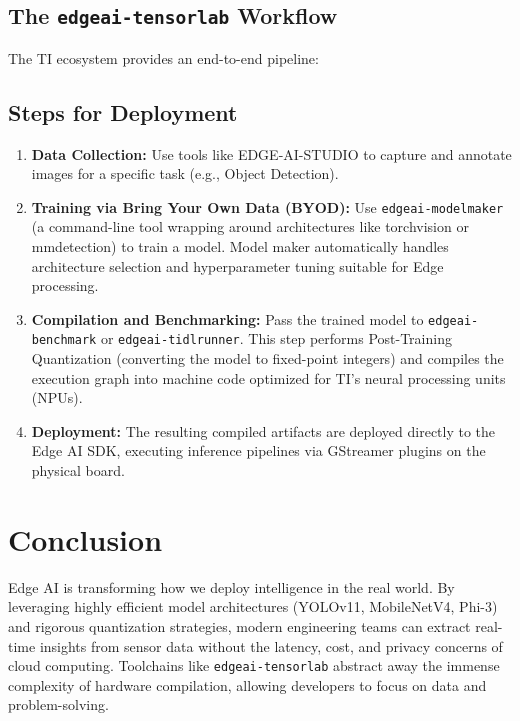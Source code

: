 \documentclass[12pt, a4paper]{article}
\begin{document}
\subsection{The \texttt{edgeai-tensorlab} Workflow}
The TI ecosystem provides an end-to-end pipeline:
\begin{center}
\end{center}

\subsection{Steps for Deployment}
\begin{enumerate}
    \item \textbf{Data Collection:} Use tools like EDGE-AI-STUDIO to capture and annotate images for a specific task (e.g., Object Detection).
    \item \textbf{Training via Bring Your Own Data (BYOD):} Use \texttt{edgeai-modelmaker} (a command-line tool wrapping around architectures like torchvision or mmdetection) to train a model. Model maker automatically handles architecture selection and hyperparameter tuning suitable for Edge processing.
    \item \textbf{Compilation and Benchmarking:} Pass the trained model to \texttt{edgeai-benchmark} or \texttt{edgeai-tidlrunner}. This step performs Post-Training Quantization (converting the model to fixed-point integers) and compiles the execution graph into machine code optimized for TI's neural processing units (NPUs).
    \item \textbf{Deployment:} The resulting compiled artifacts are deployed directly to the Edge AI SDK, executing inference pipelines via GStreamer plugins on the physical board.
\end{enumerate}

\section{Conclusion}
Edge AI is transforming how we deploy intelligence in the real world. By leveraging highly efficient model architectures (YOLOv11, MobileNetV4, Phi-3) and rigorous quantization strategies, modern engineering teams can extract real-time insights from sensor data without the latency, cost, and privacy concerns of cloud computing. Toolchains like \texttt{edgeai-tensorlab} abstract away the immense complexity of hardware compilation, allowing developers to focus on data and problem-solving.
\end{document}
